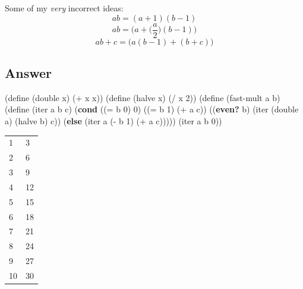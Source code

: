\documentclass[
]{article}
\newenvironment{Shaded}{}{}
\newcommand{\DecValTok}[1]{\textcolor[rgb]{0.25,0.63,0.44}{#1}}
\newcommand{\ExtensionTok}[1]{#1}
\newcommand{\FunctionTok}[1]{\textcolor[rgb]{0.02,0.16,0.49}{#1}}
\newcommand{\KeywordTok}[1]{\textcolor[rgb]{0.00,0.44,0.13}{\textbf{#1}}}
\newcommand{\NormalTok}[1]{#1}
\newcommand{\OperatorTok}[1]{\textcolor[rgb]{0.40,0.40,0.40}{#1}}
\begin{document}
Some of my \emph{very} incorrect ideas: \[ab = (a+1)(b-1)\]
\[ab = \big(a+\Big(\frac{a}{2}\Big)(b-1)\big)\]
\[ab+c = \big(a(b-1)+(b+c)\big)\]

\hypertarget{answer-16}{%
\subsection{Answer}\label{answer-16}}

\hypertarget{fast-mult-iter}{%
\label{fast-mult-iter}}%
\begin{Shaded}
\begin{Highlighting}[numbers=left,,]
\NormalTok{(}\ExtensionTok{define}\FunctionTok{ }\NormalTok{(double x)}
\NormalTok{  (}\OperatorTok{+}\NormalTok{ x x))}
\NormalTok{(}\ExtensionTok{define}\FunctionTok{ }\NormalTok{(halve x)}
\NormalTok{  (}\OperatorTok{/}\NormalTok{ x }\DecValTok{2}\NormalTok{))}
\NormalTok{(}\ExtensionTok{define}\FunctionTok{ }\NormalTok{(fast{-}mult a b)}
\NormalTok{  (}\ExtensionTok{define}\FunctionTok{ }\NormalTok{(iter a b c)}
\NormalTok{    (}\KeywordTok{cond}\NormalTok{ ((}\OperatorTok{=}\NormalTok{ b }\DecValTok{0}\NormalTok{) }\DecValTok{0}\NormalTok{)}
\NormalTok{          ((}\OperatorTok{=}\NormalTok{ b }\DecValTok{1}\NormalTok{) (}\OperatorTok{+}\NormalTok{ a c))}
\NormalTok{          ((}\KeywordTok{even?}\NormalTok{ b)}
\NormalTok{           (iter (double a) (halve b) c))}
\NormalTok{          (}\KeywordTok{else}\NormalTok{ (iter a (}\OperatorTok{{-}}\NormalTok{ b }\DecValTok{1}\NormalTok{) (}\OperatorTok{+}\NormalTok{ a c)))))}
\NormalTok{  (iter a b }\DecValTok{0}\NormalTok{))}
\end{Highlighting}
\end{Shaded}

\begin{longtable}[]{@{}ll@{}}
\toprule
\endhead
1 & 3 \\
2 & 6 \\
3 & 9 \\
4 & 12 \\
5 & 15 \\
6 & 18 \\
7 & 21 \\
8 & 24 \\
9 & 27 \\
10 & 30 \\
\bottomrule
\end{longtable}
\end{document}
